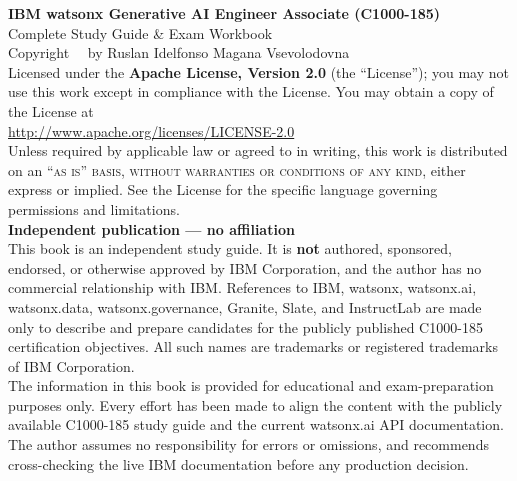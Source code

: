 
\bookcover

\cleardoublepage

\thispagestyle{empty}
\vspace*{\fill}
\begin{center}
    \textbf{IBM watsonx Generative AI Engineer Associate (C1000-185)}\\
    Complete Study Guide \& Exam Workbook\\[1cm]

    Copyright \textcopyright\ \the\year\ by Ruslan Idelfonso Magana Vsevolodovna\\[0.5cm]

    Licensed under the \textbf{Apache License, Version 2.0} (the ``License''); you may not use this work except in compliance with the License. You may obtain a copy of the License at \\
    \url{http://www.apache.org/licenses/LICENSE-2.0}\\[0.5cm]
    Unless required by applicable law or agreed to in writing, this work is distributed on an ``\textsc{as is}'' \textsc{basis, without warranties or conditions of any kind}, either express or implied. See the License for the specific language governing permissions and limitations.\\[1cm]

    \textbf{Independent publication --- no affiliation}\\
    This book is an independent study guide. It is \textbf{not} authored, sponsored, endorsed, or otherwise approved by IBM Corporation, and the author has no commercial relationship with IBM. References to IBM, watsonx, watsonx.ai, watsonx.data, watsonx.governance, Granite, Slate, and InstructLab are made only to describe and prepare candidates for the publicly published \mbox{C1000-185} certification objectives. All such names are trademarks or registered trademarks of IBM Corporation.\\[0.5cm]

    The information in this book is provided for educational and exam-preparation purposes only. Every effort has been made to align the content with the publicly available C1000-185 study guide and the current watsonx.ai API documentation. The author assumes no responsibility for errors or omissions, and recommends cross-checking the live IBM documentation before any production decision.\\[1cm]


\end{center}
